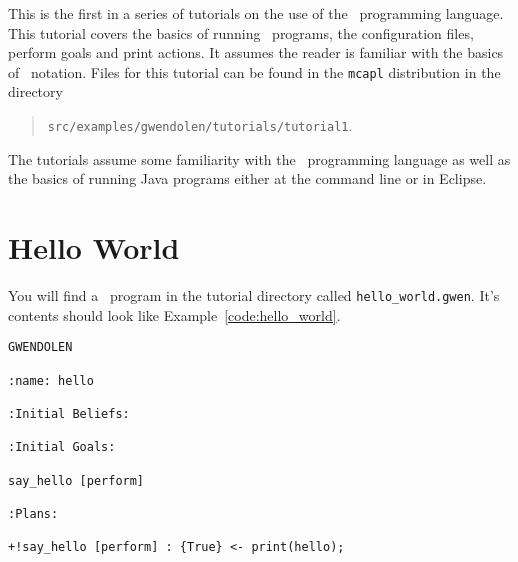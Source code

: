\label{tutorial:gwendolen:introduction}
This is the first in a series of tutorials on the use of the \gwendolen\ programming language.  This tutorial covers the basics of running \gwendolen\ programs, the configuration files, perform goals and print actions.  It assumes the reader is familiar with the basics of \prolog\ notation.
Files for this tutorial can be found in the
\texttt{mcapl} distribution in the directory
\begin{quote}
\texttt{src/examples/gwendolen/tutorials/tutorial1}.
\end{quote}
%
The tutorials assume some familiarity with the \prolog\ programming language as well as the basics of running Java programs either at the command line or in Eclipse.

\section{Hello World}

You will find a \gwendolen\ program in the tutorial directory called \texttt{hello\_world.gwen}.  It's contents should look like Example~\ref{code:hello_world}.
\begin{ourexample}
\label{code:hello_world}
\begin{lstlisting}[basicstyle=\footnotesize\sffamily,language=Gwendolen]
GWENDOLEN

:name: hello

:Initial Beliefs:

:Initial Goals:

say_hello [perform]

:Plans:

+!say_hello [perform] : {True} <- print(hello);
\end{lstlisting}
\end{ourexample}

